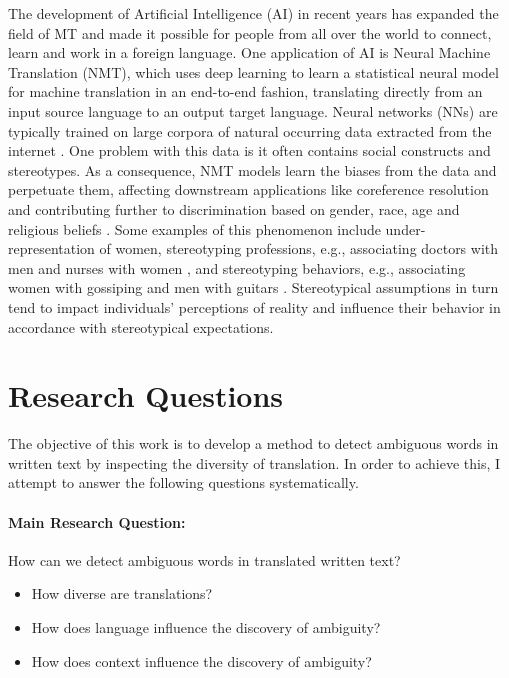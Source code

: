 The development of Artificial Intelligence (AI) in recent years has expanded the field of MT and made it possible for people from all over the world to connect, learn and work in a foreign language. One application of AI is Neural Machine Translation (NMT), which uses deep learning to learn a statistical neural model for machine translation in an end-to-end fashion, translating directly from an input source language to an output target language. Neural networks (NNs) are typically trained on large corpora of natural occurring data extracted from the internet \parencite{NMT}. 
One problem with this data is it often contains social constructs and stereotypes. As a consequence, NMT models learn the biases from the data and perpetuate them, affecting downstream applications like coreference resolution \parencite{Zhao_2018_coreference} and contributing further to discrimination based on gender, race, age and religious beliefs \parencite{Rudinger_2017}. Some examples of this phenomenon include under-representation of women, stereotyping professions, e.g., associating doctors with men and nurses with women \parencite{Escud_Font_2019}, and stereotyping behaviors, e.g., associating women with gossiping and men with guitars \parencite{Rudinger_2017}. Stereotypical assumptions in turn tend to impact individuals' perceptions of reality and influence their behavior in accordance with stereotypical expectations.

\section{Research Questions}
\label{sec:Introduction:Questions}

The objective of this work is to develop a method to detect ambiguous words in written text by inspecting the diversity of translation. In order to achieve this, I attempt to answer the following questions systematically.

\paragraph{Main Research Question: } How can we detect ambiguous words in translated written text?
\begin{itemize}
    \item How diverse are translations? %
    \item How does language influence the discovery of ambiguity? %
    \item How does context influence the discovery of ambiguity? 
\end{itemize}

